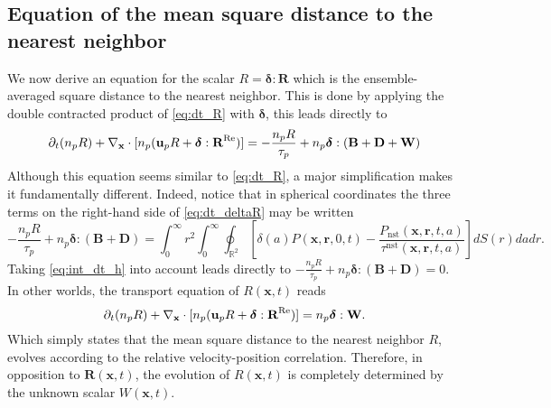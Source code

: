 \subsection{Equation of the mean square distance to the nearest neighbor}

We now derive an equation for the scalar $R = \bm\delta : \textbf{R}$ which is the ensemble-averaged square distance to the nearest neighbor. 
This is done by applying the double contracted product of \ref{eq:dt_R} with $\bm\delta$, this leads directly to 
\begin{equation}
    \pddt (n_pR)
    + \pddx \cdot [n_p(\textbf{u}_pR
    + \bm\delta :\textbf{R}^\text{Re})]
    = 
    - \frac{n_pR}{\tau_p}
    +n_p  \bm\delta : (\textbf{B}+\textbf{D}+\textbf{W})
    \label{eq:dt_deltaR}
\end{equation}
Although this equation seems similar to \ref{eq:dt_R}, a major simplification makes it fundamentally different. 
Indeed, notice that in spherical coordinates the three terms on the right-hand side of \ref{eq:dt_deltaR} may be written
\begin{equation*}
    - \frac{n_pR}{\tau_p}
    + n_p  \bm\delta : (\textbf{B}+\textbf{D})
    = 
    \int_0^\infty r^2 \int_{0}^{\infty}\oint_{\mathbb{R}^2}\left[
        \delta(a)P(\textbf{x},\textbf{r},0,t)
    - \frac{P_\text{nst}(\textbf{x},\textbf{r},t,a)}{\tau^\text{nst}(\textbf{x},\textbf{r},t,a)}
    \right]dS(r) da dr.
\end{equation*}
Taking \ref{eq:int_dt_h} into account leads directly to $- \frac{n_pR}{\tau_p} + n_p  \bm\delta : (\textbf{B}+\textbf{D}) = 0$. 
In other worlds, the transport equation of $R(\textbf{x},t)$ reads 
\begin{equation}
    \pddt (n_pR)
    + \pddx \cdot [n_p(\textbf{u}_pR
    + \bm\delta : \textbf{R}^\text{Re})]
    = 
    n_p\bm\delta : \textbf{W}. 
    \label{eq:dt_deltaR2}
\end{equation}
Which simply states that the mean square distance to the nearest neighbor $R$, evolves according to the relative velocity-position correlation.
Therefore, in opposition to $\textbf{R}(\textbf{x},t)$, the evolution of $R(\textbf{x},t)$ is completely determined by the unknown scalar $W(\textbf{x},t)$. 


